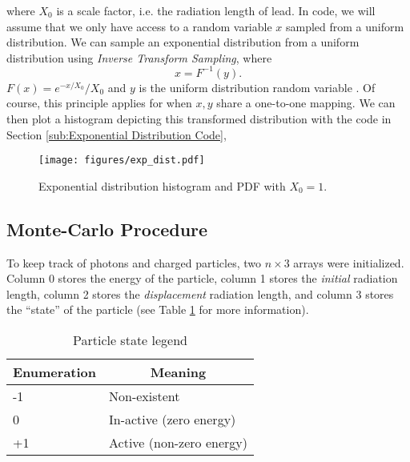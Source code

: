 \documentclass{article}
\begin{document}
where \( X_{0} \) is a scale factor, i.e. the radiation length of lead. In code, we will assume that we only have access to a random variable \( x \) sampled from a uniform distribution. We can sample an exponential distribution from a uniform distribution using \textit{Inverse Transform Sampling}, where
\begin{equation}
    x = F^{-1} (y) .
\end{equation}
\( F(x)= e^{-x / X_{0}} / X_{0} \) and \( y \) is the uniform distribution random variable \cite{bohm}. Of course, this principle applies for when \( x, y \) share a one-to-one mapping. We can then plot a histogram depicting this transformed distribution with the code in Section \ref{sub:Exponential Distribution Code},

\begin{figure}[htpb]
    \begin{center}
        \texttt{[image: figures/exp\_dist.pdf]}
    \end{center}
    \caption{Exponential distribution histogram and PDF with \( X_{0} = 1 \).}\label{fig:exp-dist}
\end{figure}

\subsection{Monte-Carlo Procedure} %
\label{sub:Monte-Carlo Procedure}
To keep track of photons and charged particles, two \( n \times 3 \) arrays were initialized. Column 0 stores the energy of the particle, column 1 stores the \textit{initial} radiation length, column 2 stores the \textit{displacement} radiation length, and column 3 stores the ``state'' of the particle (see Table \ref{tab:particle-state} for more information).
\begin{table}
    \begin{center}
        \begin{tabular}[c]{l|l}
            \multicolumn{1}{c|}{\textbf{Enumeration}} & 
            \multicolumn{1}{c}{\textbf{Meaning}} \\
            \hline
            -1 & Non-existent \\
            0 & In-active (zero energy) \\
            +1 & Active (non-zero energy)
        \end{tabular}
    \end{center}
    \caption{Particle state legend}\label{tab:particle-state}
\end{table}
\end{document}
